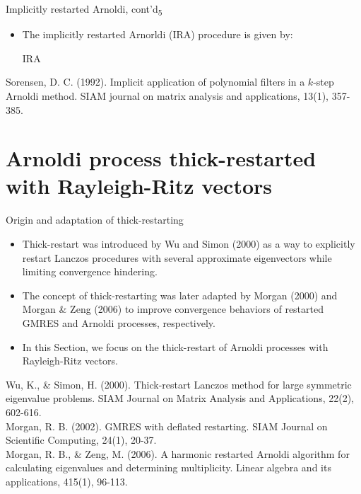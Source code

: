\documentclass[t,usepdftitle=false]{beamer}
\begin{document}
\begin{frame}{Implicitly restarted Arnoldi, cont'd\textsubscript{5}}
\begin{itemize}
\item[] The implicitly restarted Arnorldi (IRA) procedure is given by:\vspace{-.25cm}
\begin{algorithm}[H]
\small
\caption{IRA}
\begin{algorithmic}[1]
\ENDFOR
{}
\end{algorithmic}
\end{algorithm}
\end{itemize}\vspace{-.25cm}
\tiny{Sorensen, D. C. (1992). Implicit application of polynomial filters in a $k$-step Arnoldi method. SIAM journal on matrix analysis and applications, 13(1), 357-385.}
\end{frame}

\section{Arnoldi process thick-restarted with Rayleigh-Ritz vectors}
\begin{frame}{Origin and adaptation of thick-restarting}
\begin{itemize}
\item Thick-restart was introduced by Wu and Simon (2000) as a way to explicitly restart Lanczos procedures with several approximate eigenvectors while limiting convergence hindering.
\item The concept of thick-restarting was later adapted by Morgan (2000) and Morgan \& Zeng (2006) to improve convergence behaviors of restarted GMRES and Arnoldi processes, respectively.
\item[] In this Section, we focus on the thick-restart of Arnoldi processes with Rayleigh-Ritz vectors.
\end{itemize}\smallskip
\tiny{Wu, K., \& Simon, H. (2000). Thick-restart Lanczos method for large symmetric eigenvalue problems. SIAM Journal on
Matrix Analysis and Applications, 22(2), 602-616.}\tinyskip\\
\tiny{Morgan, R. B. (2002). GMRES with deflated restarting. SIAM Journal on Scientific Computing, 24(1), 20-37.}\tinyskip\\
\tiny{Morgan, R. B., \& Zeng, M. (2006). A harmonic restarted Arnoldi algorithm for calculating eigenvalues and determining
multiplicity. Linear algebra and its applications, 415(1), 96-113.}
\end{frame}
\end{document}
